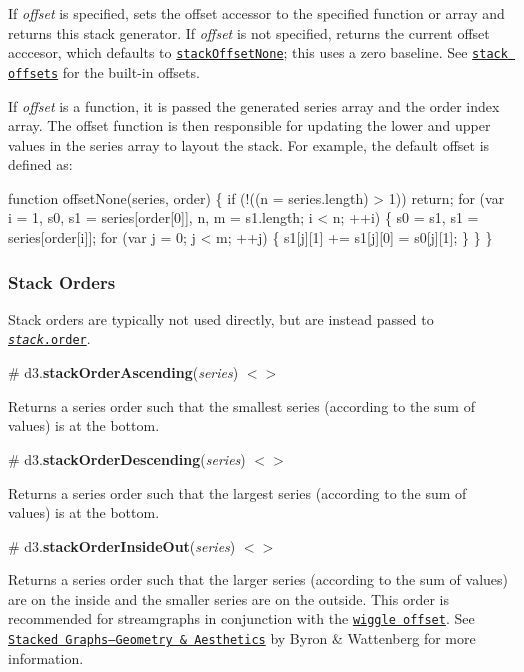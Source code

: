 If {\itshape offset} is specified, sets the offset accessor to the specified function or array and returns this stack generator. If {\itshape offset} is not specified, returns the current offset acccesor, which defaults to \href{#stackOffsetNone}{\tt stack\+Offset\+None}; this uses a zero baseline. See \href{#stack-offsets}{\tt stack offsets} for the built-\/in offsets.

If {\itshape offset} is a function, it is passed the generated series array and the order index array. The offset function is then responsible for updating the lower and upper values in the series array to layout the stack. For example, the default offset is defined as\+:


\begin{DoxyCode}
function offsetNone(series, order) \{
  if (!((n = series.length) > 1)) return;
  for (var i = 1, s0, s1 = series[order[0]], n, m = s1.length; i < n; ++i) \{
    s0 = s1, s1 = series[order[i]];
    for (var j = 0; j < m; ++j) \{
      s1[j][1] += s1[j][0] = s0[j][1];
    \}
  \}
\}
\end{DoxyCode}


\subsubsection*{Stack Orders}

Stack orders are typically not used directly, but are instead passed to \href{#stack_order}{\tt {\itshape stack}.order}.

\label{_stackOrderAscending}%
\# d3.{\bfseries stack\+Order\+Ascending}({\itshape series}) \href{https://github.com/d3/d3-shape/blob/master/src/order/ascending.js}{\tt $<$$>$}

Returns a series order such that the smallest series (according to the sum of values) is at the bottom.

\label{_stackOrderDescending}%
\# d3.{\bfseries stack\+Order\+Descending}({\itshape series}) \href{https://github.com/d3/d3-shape/blob/master/src/order/descending.js}{\tt $<$$>$}

Returns a series order such that the largest series (according to the sum of values) is at the bottom.

\label{_stackOrderInsideOut}%
\# d3.{\bfseries stack\+Order\+Inside\+Out}({\itshape series}) \href{https://github.com/d3/d3-shape/blob/master/src/order/insideOut.js}{\tt $<$$>$}

Returns a series order such that the larger series (according to the sum of values) are on the inside and the smaller series are on the outside. This order is recommended for streamgraphs in conjunction with the \href{#stackOffsetWiggle}{\tt wiggle offset}. See \href{http://leebyron.com/streamgraph/}{\tt Stacked Graphs—\+Geometry \& Aesthetics} by Byron \& Wattenberg for more information.

